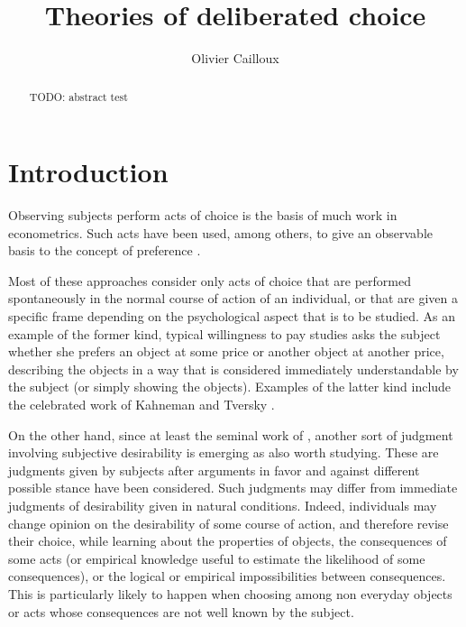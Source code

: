\documentclass[version=last, pagesize, twoside=off, bibliography=totoc, DIV=calc, fontsize=12pt, a4paper, french, english]{scrartcl}
\begin{document}
\title{Theories of deliberated choice}
\author{Olivier Cailloux}
\makeatletter
\makeatother
\maketitle

\begin{abstract}
	TODO: abstract test
\end{abstract}

\section{Introduction} 
Observing subjects perform acts of choice is the basis of much work in econometrics. Such acts have been used, among others, to give an observable basis to the concept of preference \citep{samuelson_foundations_1983}. %

Most of these approaches consider only acts of choice that are performed spontaneously in the normal course of action of an individual, or that are given a specific frame depending on the psychological aspect that is to be studied. As an example of the former kind, typical willingness to pay studies asks the subject whether she prefers an object at some price or another object at another price, describing the objects in a way that is considered immediately understandable by the subject (or simply showing the objects). Examples of the latter kind include the celebrated work of Kahneman and Tversky \citep{bell_descriptive_1988, kahneman_thinking_2012}.

On the other hand, since at least the seminal work of \citet{fishkin_when_2011}, another sort of judgment involving subjective desirability is emerging as also worth studying. These are judgments given by subjects after arguments in favor and against different possible stance have been considered. Such judgments may differ from immediate judgments of desirability given in natural conditions. Indeed, individuals may change opinion on the desirability of some course of action, and therefore revise their choice, while learning about the properties of objects, the consequences of some acts (or empirical knowledge useful to estimate the likelihood of some consequences), or the logical or empirical impossibilities between consequences. This is particularly likely to happen when choosing among non everyday objects or acts whose consequences are not well known by the subject. 
\end{document}
